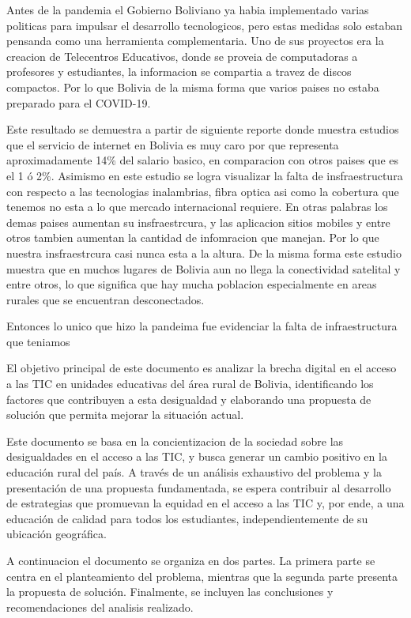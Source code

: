\documentclass[12pt]{article}
\begin{document}
Antes de la pandemia el Gobierno Boliviano ya habia implementado varias
politicas para impulsar el desarrollo tecnologicos, pero estas medidas solo
estaban pensanda como una herramienta complementaria. Uno de sus proyectos era
la creacion de Telecentros Educativos, donde se proveia de computadoras a
profesores y estudiantes, la informacion se compartia a travez de discos
compactos. Por lo que Bolivia de la misma forma que varios paises no estaba
preparado para el COVID-19.

Este resultado se demuestra a partir de siguiente
\parencite{garcia_zaballos_conectividad_2022} reporte donde muestra estudios que
el servicio de internet en Bolivia es muy caro por que representa
aproximadamente 14\% del salario basico, en comparacion con otros paises que es
el 1 ó 2\%. Asimismo en este estudio se logra visualizar la falta de
insfraestructura con respecto a las tecnologias inalambrias, fibra optica asi
como la cobertura que tenemos no esta a lo que mercado internacional requiere.
En otras palabras los demas paises aumentan su insfraestrcura, y las aplicacion
sitios mobiles y entre otros tambien aumentan la cantidad de infomracion que
manejan. Por lo que nuestra insfraestrcura casi nunca esta a la altura. De la
misma forma este estudio muestra que en muchos lugares de Bolivia aun no llega
la conectividad satelital y entre otros, lo que significa que hay mucha
poblacion especialmente en areas rurales que se encuentran desconectados.

Entonces lo unico que hizo la pandeima fue evidenciar la falta de infraestructura que teniamos

El objetivo principal de este documento es analizar la brecha digital en el
acceso a las TIC en unidades educativas del área rural de Bolivia, identificando
los factores que contribuyen a esta desigualdad y elaborando una propuesta de
solución que permita mejorar la situación actual.

Este documento se basa en la concientizacion de la sociedad sobre las
desigualdades en el acceso a las TIC, y busca generar un cambio positivo en la
educación rural del país. A través de un análisis exhaustivo del problema y la
presentación de una propuesta fundamentada, se espera contribuir al desarrollo
de estrategias que promuevan la equidad en el acceso a las TIC y, por ende, a
una educación de calidad para todos los estudiantes, independientemente de su
ubicación geográfica.

A continuacion el documento se organiza en dos partes. La primera parte se
centra en el planteamiento del problema, mientras que la segunda parte presenta
la propuesta de solución. Finalmente, se incluyen las conclusiones y
recomendaciones del analisis realizado.
\end{document}
